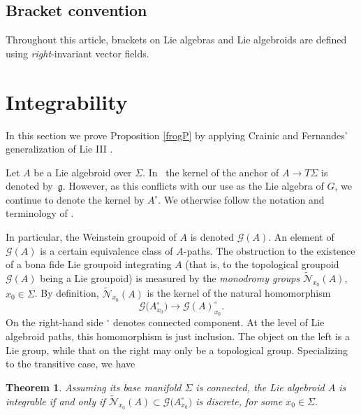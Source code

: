 \documentclass[11pt]{article}
\numberwithin{equation}{section}
\numberwithin{equation}{section}
\newtheorem{Theorem}{Theorem}[section]
\begin{document}
\subsection*{Bracket convention}
Throughout this article, brackets on
Lie algebras and Lie algebroids are defined using {\em
right}-invariant vector fields.

\section{Integrability}
\label{newsec}

In this section we prove Proposition \ref{frogP} by applying Crainic
and Fernandes' generalization of Lie III \cite{Crainic_Fernandes_03}.

Let $A$ be a Lie algebroid over $\Sigma$. In~\cite{Crainic_Fernandes_03, Crainic_Fernandes_11} the kernel of the
anchor of $A \rightarrow T \Sigma$ is denoted by~${\mathfrak g}
$. However, as this conflicts with our use as the Lie algebra of $G$,
we continue to denote the kernel by $A^\circ$. We otherwise follow the
notation and terminology of \cite{Crainic_Fernandes_11}.

In particular, the Weinstein groupoid of $A$ is denoted ${\mathcal
G}(A)$. An element of ${\mathcal G}(A)$ is a certain equivalence class
of $A$-paths. The obstruction to the existence of a bona fide Lie
groupoid integrating $A$ (that is, to the topological groupoid
${\mathcal G}(A)$ being a Lie groupoid) is measured by the {\it monodromy groups} $\tilde {\mathcal N}_{x_0}(A) $, $x_0 \in \Sigma
$. By definition, $\tilde {\mathcal N}_{x_0}(A) $ is the kernel of the
natural homomorphism
\begin{equation}
{\mathcal G}\big(A^\circ_{x_0}\big)\rightarrow {\mathcal G}(A)^\circ_{x_0} \label{dqp}.
\end{equation} On the right-hand side ${}^\circ$ denotes connected
component. At the level of Lie algebroid paths, this homomorphism is
just inclusion. The object on the left is a Lie group, while that on
the right may only be a topological group. Specializing
\cite{Crainic_Fernandes_03} to the transitive case, we have

\begin{Theorem}%
 Assuming its base manifold $\Sigma $ is connected, the Lie algebroid
 $A$ is integrable if and only if
 $\tilde {\mathcal N}_{x_0}(A) \subset {\mathcal G}\big(A^\circ_{x_0}\big)$
 is discrete, for some $x_0 \in \Sigma $.
\end{Theorem}
\end{document}
